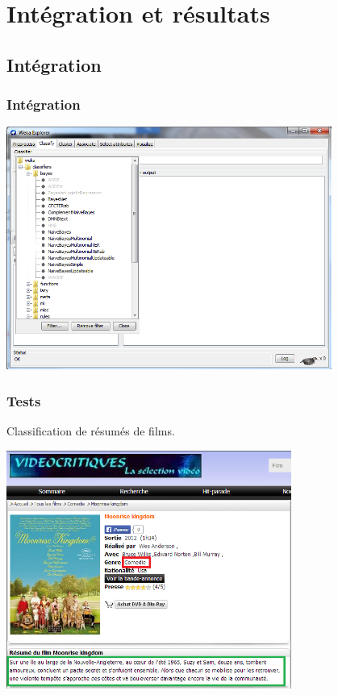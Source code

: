 \documentclass[12pt]{beamer}
\begin{document}
\section{Intégration et résultats}
\subsection{Intégration}
\begin{frame}
\frametitle{Intégration}

\begin{center}
\includegraphics[width=0.80\textwidth]{wekaAlgos}~\\[1cm]  
\end{center}


\end{frame}


\begin{frame}
\frametitle{Tests}
Classification de résumés de films.
\begin{center}
\includegraphics[width=0.70\textwidth]{vc}
\end{center}

\end{frame}
\end{document}
